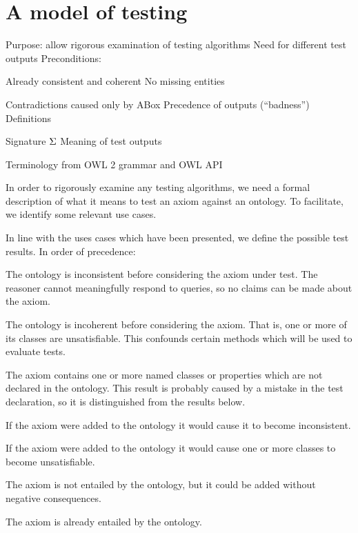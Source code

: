 \documentclass[paper.tex]{subfiles}
\begin{document}
\section{A model of testing}
\label{sec:model}

\begin{todos}
  \todo Purpose: allow rigorous examination of testing algorithms
  \todo Need for different test outputs
  \todo Preconditions:
  \begin{todos}
    \todo Already consistent and coherent
    \todo No missing entities
  \end{todos}
  \todo Contradictions caused only by ABox
  \todo Precedence of outputs (``badness'')
  \todo Definitions
  \begin{todos}
    \todo Signature $\Sigma$
    \todo Meaning of test outputs
  \end{todos}
  \todo Terminology from OWL 2 grammar and OWL API
\end{todos}

In order to rigorously examine any testing algorithms, we need a formal description of what it means to test an axiom against an ontology.  To facilitate, we identify some relevant use cases.


In line with the uses cases which have been presented, we define the possible test results.  In order of precedence:
\begin{description}[
  before={\renewcommand\makelabel[1]{\normalfont\itshape##1:}},
  labelindent=1em,
  leftmargin=2em,
  nosep,
]
  \item[Ontology already inconsistent]  The ontology is inconsistent before considering the axiom under test.  The reasoner cannot meaningfully respond to queries, so no claims can be made about the axiom.
  \item[Ontology already incoherent]  The ontology is incoherent before considering the axiom.  That is, one or more of its classes are unsatisfiable.  This confounds certain methods which will be used to evaluate tests.
  \item[Missing entity in axiom]  The axiom contains one or more named classes or properties which are not declared in the ontology.  This result is probably caused by a mistake in the test declaration, so it is distinguished from the results below.
  \item[Axiom causes inconsistency]  If the axiom were added to the ontology it would cause it to become inconsistent.
  \item[Axiom causes incoherence]  If the axiom were added to the ontology it would cause one or more classes to become unsatisfiable.
  \item[Axiom absent]  The axiom is not entailed by the ontology, but it could be added without negative consequences.
  \item[Axiom entailed]  The axiom is already entailed by the ontology.
\end{description}
\end{document}
